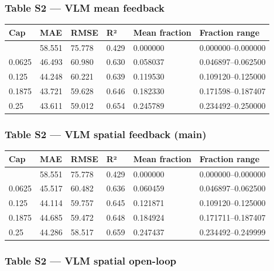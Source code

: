 \documentclass[11pt,a4paper]{article}
\begin{document}
\subsubsection{Table S2 --- VLM mean feedback}\label{table-s2-vlm-mean-feedback}

{ %
\begin{longtable}[]{@{}llllll@{}}
\toprule\noalign{}
Cap & MAE & RMSE & R² & Mean fraction & Fraction range \\
\midrule\noalign{}
\endhead
\bottomrule\noalign{}
\endlastfoot
0.0 & 58.551 & 75.778 & 0.429 & 0.000000 & 0.000000--0.000000 \\
0.0625 & 46.493 & 60.980 & 0.630 & 0.058037 & 0.046897--0.062500 \\
0.125 & 44.248 & 60.221 & 0.639 & 0.119530 & 0.109120--0.125000 \\
0.1875 & 43.721 & 59.628 & 0.646 & 0.182330 & 0.171598--0.187407 \\
0.25 & 43.611 & 59.012 & 0.654 & 0.245789 & 0.234492--0.250000 \\
\end{longtable}
}

\subsubsection{Table S2 --- VLM spatial feedback (main)}\label{table-s2-vlm-spatial-feedback-main}

{ %
\begin{longtable}[]{@{}llllll@{}}
\toprule\noalign{}
Cap & MAE & RMSE & R² & Mean fraction & Fraction range \\
\midrule\noalign{}
\endhead
\bottomrule\noalign{}
\endlastfoot
0.0 & 58.551 & 75.778 & 0.429 & 0.000000 & 0.000000--0.000000 \\
0.0625 & 45.517 & 60.482 & 0.636 & 0.060459 & 0.046897--0.062500 \\
0.125 & 44.114 & 59.757 & 0.645 & 0.121871 & 0.109120--0.125000 \\
0.1875 & 44.685 & 59.472 & 0.648 & 0.184924 & 0.171711--0.187407 \\
0.25 & 44.286 & 58.517 & 0.659 & 0.247437 & 0.234492--0.249999 \\
\end{longtable}
}

\subsubsection{Table S2 --- VLM spatial open-loop}\label{table-s2-vlm-spatial-open-loop}
\end{document}
